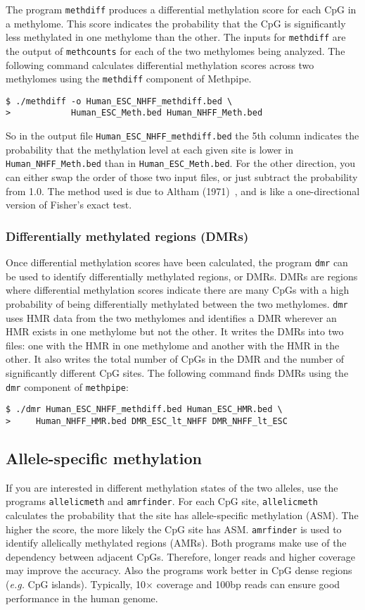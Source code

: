 \documentclass[10pt]{article}
\newcommand{\meth}{\texttt{methpipe}}
\newcommand{\prog}[1]{\texttt{#1}}
\newcommand{\fn}[1]{\texttt{#1}}
\begin{document}
The program \prog{methdiff} produces a differential methylation score
for each CpG in a methylome. This score indicates the probability that
the CpG is significantly less methylated in one methylome than the
other. The inputs for \prog{methdiff} are the output of
\prog{methcounts} for each of the two methylomes being analyzed. The
following command calculates differential methylation scores across
two methylomes using the \prog{methdiff} component of Methpipe.
\begin{verbatim}
$ ./methdiff -o Human_ESC_NHFF_methdiff.bed \
>            Human_ESC_Meth.bed Human_NHFF_Meth.bed
\end{verbatim}
So in the output file \fn{Human\_ESC\_NHFF\_methdiff.bed} the 5th
column indicates the probability that the methylation level at each
given site is lower in \fn{Human\_NHFF\_Meth.bed} than in
\fn{Human\_ESC\_Meth.bed}. For the other direction, you can either
swap the order of those two input files, or just subtract the
probability from 1.0. The method used is due to Altham
(1971)~\cite{altham1971exact}, and is like a one-directional version
of Fisher's exact test.

\subsubsection{Differentially methylated regions (DMRs)}
\label{sec:dmr}

Once differential methylation scores have been calculated, the program
\prog{dmr} can be used to identify differentially methylated regions,
or DMRs. DMRs are regions where differential methylation scores
indicate there are many CpGs with a high probability of being
differentially methylated between the two methylomes.
\prog{dmr} uses HMR data from the two methylomes and identifies
a DMR wherever an HMR exists in one methylome but not the other.
It writes the DMRs into two files: one with the HMR in one methylome
and another with the HMR in the other.  It also writes the total number
of CpGs in the DMR and the number of significantly different CpG sites.
The following command finds DMRs using the \prog{dmr} component
of \meth{}:
\begin{verbatim}
$ ./dmr Human_ESC_NHFF_methdiff.bed Human_ESC_HMR.bed \
>     Human_NHFF_HMR.bed DMR_ESC_lt_NHFF DMR_NHFF_lt_ESC
\end{verbatim}

\subsection{Allele-specific methylation}
If you are interested in different methylation states of the two alleles, use the programs \prog{allelicmeth} and \prog{amrfinder}. For each CpG site, \prog{allelicmeth} calculates the probability that the site has allele-specific methylation (ASM). The higher the score, the more likely the CpG site has ASM. \prog{amrfinder} is used to identify allelically methylated regions (AMRs). Both programs make use of the dependency between adjacent CpGs. Therefore, longer reads and higher coverage may improve the accuracy. Also the programs work better in CpG dense regions ({\em e.g.} CpG islands). Typically, 10$\times$ coverage and 100bp reads can ensure good performance in the human genome.
\end{document}
